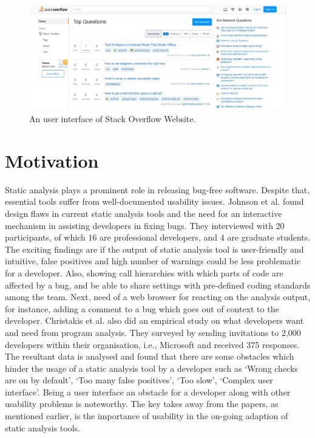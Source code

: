 \begin{figure}[hbt!]
	\centering
	\includegraphics[width=\linewidth]{figures/stackoverflow}
	\caption{An user interface of Stack Overflow Website. \cite{stackoverflow}}
	\label{fig:stackoverflow}
\end{figure}

\section{Motivation}
\label{ch:motivation_report}

Static analysis plays a prominent role in releasing bug-free software. Despite that, essential tools suffer from well-documented usability issues. \cite{CB16,JSMB13} Johnson et al. \cite{JSMB13} found design flaws in current static analysis tools and the need for an interactive mechanism in assisting developers in fixing bugs. They interviewed with 20 participants, of which 16 are professional developers, and 4 are graduate students. The exciting findings are if the output of static analysis tool is user-friendly and intuitive, false positives and high number of warnings could be less problematic for a developer. Also, showing call hierarchies with which parts of code are affected by a bug, and be able to share settings with pre-defined coding standards among the team. Next, need of a web browser for reacting on the analysis output, for instance, adding a comment to a bug which goes out of context to the developer. Christakis et al. \cite{CB16} also did an empirical study on what developers want and need from program analysis. They surveyed by sending invitations to 2,000 developers within their organisation, i.e., Microsoft and received 375 responses. The resultant data is analysed and found that there are some obstacles which hinder the usage of a static analysis tool by a developer such as ‘Wrong checks are on by default’, ‘Too many false positives’, ‘Too slow’, ‘Complex user interface’. Being a user interface an obstacle for a developer along with other usability problems is noteworthy. The key takes away from the papers, as mentioned earlier, is the importance of usability in the on-going adaption of static analysis tools. \\

